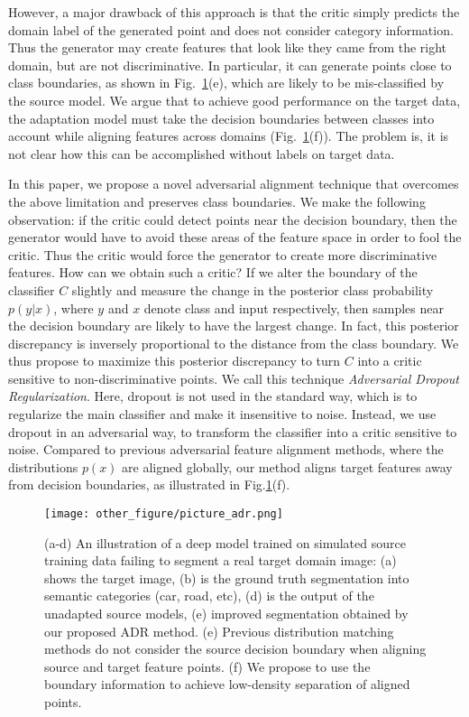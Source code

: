 \documentclass{article} \usepackage{iclr2018_conference,times}
\begin{document}
However, a major drawback of this approach is that the critic simply predicts the domain label of the generated point and does not consider category information. Thus the generator may create features that look like they came from the right domain, but are not discriminative. In particular, it can generate points close to class boundaries, as shown in Fig.~\ref{fig:intro}(e), which are likely to be mis-classified by the source model. We argue that to achieve good performance on the target data, the adaptation model must take the decision boundaries between classes into account while aligning features across domains (Fig.~\ref{fig:intro}(f)). The problem is, it is not clear how this can be accomplished without labels on target data.

In this paper, we propose a novel adversarial alignment technique that overcomes the above limitation and preserves class boundaries.
We make the following observation: if the critic could detect points near the decision boundary, then the generator would have to avoid these areas of the feature space in order to fool the critic. Thus the critic would force the generator to create more discriminative features. How can we obtain such a critic? If we alter the boundary of the classifier $C$ slightly and measure the change in the posterior class probability $p(y|x)$, where $y$ and $x$ denote class and input respectively, then samples near the decision boundary are likely to have the largest change. In fact, this posterior discrepancy is inversely proportional to the distance from the class boundary. We thus propose to maximize this posterior discrepancy to turn $C$ into a critic sensitive to non-discriminative points. We call this technique \textit{Adversarial Dropout Regularization}. Here, dropout is not used in the standard way, which is to regularize the main classifier and make it insensitive to noise. Instead, we use dropout in an adversarial way, to transform the classifier into a critic sensitive to noise. Compared to previous adversarial feature alignment methods, where the distributions $p(x)$ are aligned globally, our method aligns target features away from decision boundaries, as illustrated in Fig.\ref{fig:intro}(f). 
\begin{figure}[t]
  \begin{center}
  \texttt{[image: other\_figure/picture\_adr.png]}
  \end{center}
 \vspace{-0.1in}
  \caption{{\small (a-d) An illustration of a deep model trained on simulated source training data failing to segment a real target domain image: (a) shows the target image, (b) is the ground truth segmentation into semantic categories (car, road, etc), (d) is the output of the unadapted source models, (e) improved segmentation obtained by our proposed ADR method. (e) Previous distribution matching methods do not consider the source decision boundary when aligning source and target feature points. (f) We propose to use the boundary information to achieve low-density separation of aligned points.}}
  \label{fig:intro}
  \end{figure}
\end{document}
